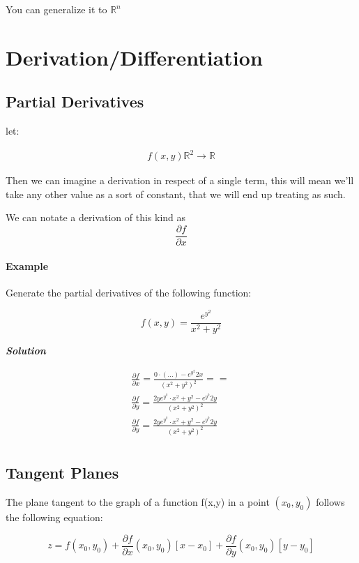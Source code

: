 \documentclass[11pt,fleqn]{book} %
\begin{document}
You can generalize it to $\mathbb{R}^n$

\section{Derivation/Differentiation}

\subsection{Partial Derivatives}

let:

\begin{gather}
    f(x,y) \mathbb{R}^2 \to \mathbb{R}
\end{gather}

Then we can imagine a derivation in respect of a single term, this will mean we'll take any 
other value as a sort of constant, that we will end up treating as such.

We can notate a derivation of this kind as $$\frac{\partial f}{\partial x}$$

\paragraph{Example}

Generate the partial derivatives of the following function:

$$f(x,y) = \frac{e^{y^{2}}}{x^2+y^2}$$

\textit{\textbf{Solution}}

\begin{gather}
    \frac{\partial f}{\partial x} = \frac{0 \cdot (...) - e^y^2 2x}{(x^2+y^2)^2} == \frac{}{}\\
    \frac{\partial f}{\partial y} = \frac{2y e^{y^{2}} \cdot x^2+y^2 - e^{y^{2}} 2y }{(x^2+y^2)^2}\\
    \frac{\partial f}{\partial y} = \frac{2y e^{y^{2}} \cdot x^2+y^2 - e^{y^{2}} 2y }{(x^2+y^2)^2}\\
\end{gather}

\subsection{Tangent Planes}

The plane tangent to the graph of a function f(x,y) in a point $(x_0, y_0)$
follows the following equation:

$$z = f(x_0, y_0) + \frac{\partial f}{\partial x} (x_0, y_0) [x - x_0] + \frac{\partial f}{\partial y} (x_0, y_0) [y - y_0] $$
\end{document}
